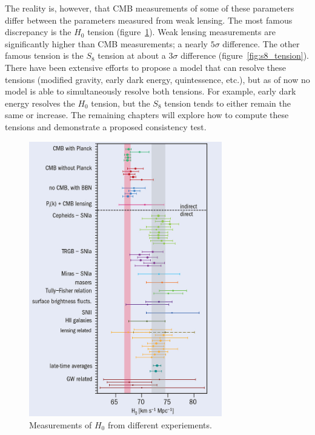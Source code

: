 The reality is, however, that CMB measurements of some of these parameters differ between the parameters measured from weak lensing. The most famous discrepancy is the $H_0$ tension (figure~\ref{fig:h0_tension}). Weak lensing measurements are significantly higher than CMB measurements; a nearly $5\sigma$ difference. The other famous tension is the $S_8$ tension at about a $3\sigma$ difference (figure~\ref{fig:s8_tension}). There have been extensive efforts to propose a model that can resolve these tensions (modified gravity, early dark energy, quintessence, etc.), but as of now no model is able to simultaneously resolve both tensions. For example, early dark energy resolves the $H_0$ tension, but the $S_8$ tension tends to either remain the same or increase. The remaining chapters will explore how to compute these tensions and demonstrate a proposed consistency test.
\begin{figure}[ht]
	\centering
	\includegraphics[width=0.75\textwidth]{plots/h0_tension.jpg}
	\caption{Measurements of $H_0$ from different experiements.}
	\label{fig:h0_tension}
\end{figure}
